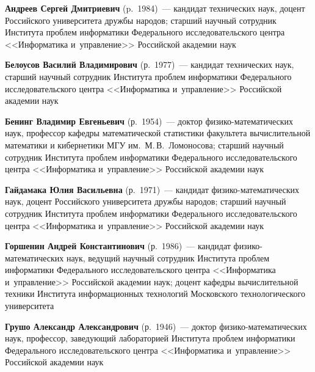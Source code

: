 \begin{multicols}{2}

\noindent
\textbf{Андреев Сергей Дмитриевич} (p.\ 1984)~---
 кандидат технических наук, доцент Российского универси\-тета дружбы народов;  
 старший научный сотрудник Института проб\-лем информатики Федерального 
 исследовательского центра <<Информатика и~управ\-ление>> Российской академии наук
 
 \vspace*{3pt}
 
\noindent
\textbf{Белоусов Василий Владимирович} (р.\ 1977)~---
кандидат технических наук, старший научный сотрудник Института проб\-лем 
информатики Федерального исследовательского центра <<Информатика и~управ\-ле\-ние>> 
Российской академии наук

\vspace*{3pt}

\noindent
\textbf{Бенинг Владимир Евгеньевич} (р.\ 1954)~---
 доктор фи\-зи\-ко-ма\-те\-ма\-ти\-че\-ских наук, профессор ка\-фед\-ры\linebreak 
 ма\-те\-ма\-ти\-че\-ской 
 статистики факультета вы\-чис\-ли\-тель\-ной математики и кибернетики МГУ им.\ 
 М.\,В.~Ломоносова; старший научный сотрудник Института проб\-лем 
 информатики Федерального исследовательского центра <<Информатика и~управ\-ле\-ние>> 
 Российской академии наук

\vspace*{3pt}

\noindent
\textbf{Гайдамака Юлия Васильевна} (р.\ 1971)~--- 
кандидат фи\-зи\-ко-ма\-те\-ма\-ти\-че\-ских наук, доцент Российского 
университета дружбы народов; старший научный сотрудник Института проб\-лем 
информатики Федерального исследовательского центра <<Информатика и~управ\-ле\-ние>> 
Российской академии наук

\vspace*{3pt}

\noindent
\textbf{Горшенин Андрей Константинович} (р.\ 1986)~---
кандидат фи\-зи\-ко-ма\-те\-ма\-ти\-че\-ских наук, ведущий научный 
сотрудник Института проб\-лем информатики Федерального исследовательского центра 
<<Информатика и~управ\-ле\-ние>> Российской академии наук;
доцент кафедры вычислительной техники Института информационных технологий 
Московского технологического университета



\vspace*{3pt}

\noindent
\textbf{Грушо Александр Александрович} (р.\ 1946)~---
доктор фи\-зи\-ко-ма\-те\-ма\-ти\-че\-ских наук, профессор, заведующий лабораторией 
Института проб\-лем информатики Федерального исследовательского центра 
<<Информатика и~управ\-ле\-ние>> Российской академии наук


\end{multicols}
